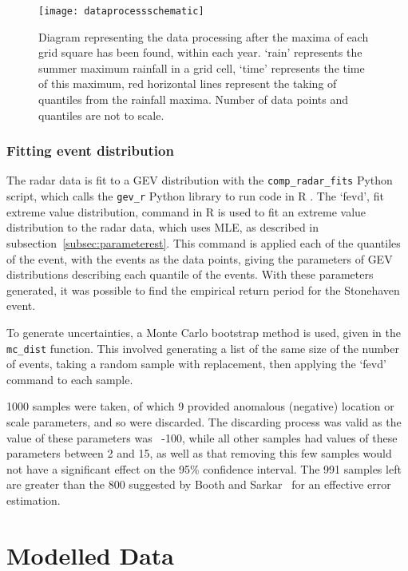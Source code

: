 \begin{figure}[H]
    \centering
    \texttt{[image: dataprocessschematic]}
    \caption[Diagram representing the data processing.]{
        Diagram representing the data processing after the maxima of each grid square has been found,
    within each year.
    `rain' represents the summer maximum rainfall in a grid cell,
        `time' represents the time of this maximum,
        red horizontal lines represent the taking of quantiles from the rainfall maxima.
    Number of data points and quantiles are not to scale.}
    \label{fig:dataprocessschematic}
\end{figure}

\subsubsection{Fitting event distribution}

The radar data is fit to a GEV distribution with the \texttt{comp\_radar\_fits} Python script,
    which calls the \texttt{gev\_r} Python library to run code in R .
The `fevd', fit extreme value distribution,
    command in R is used to fit an extreme value distribution to the radar data,
    which uses MLE, as described in subsection~\ref{subsec:parameterest}.
This command is applied each of the quantiles of the event,
    with the events as the data points,
    giving the parameters of GEV distributions describing each quantile of the events.
With these parameters generated,
     it was possible to find the empirical return period for the Stonehaven event.

To generate uncertainties,
    a Monte Carlo bootstrap method is used,
    given in the \texttt{mc\_dist} function.
This involved generating a list of the same size of the number of events,
    taking a random sample with replacement,
    then applying the `fevd' command to each sample.

1000 samples were taken,
    of which 9 provided anomalous (negative) location or scale parameters,
    and so were discarded.
The discarding process was valid as the value of these parameters was ~-100,
    while all other samples had values of these parameters between 2 and 15,
    as well as that removing this few samples would not have a significant effect on the 95\% confidence interval.
The 991 samples left are greater than the 800 suggested by Booth and Sarkar~\cite{Booth_Sarkar_1998}
    for an effective error estimation.

\section{Modelled Data}\label{sec:model}

